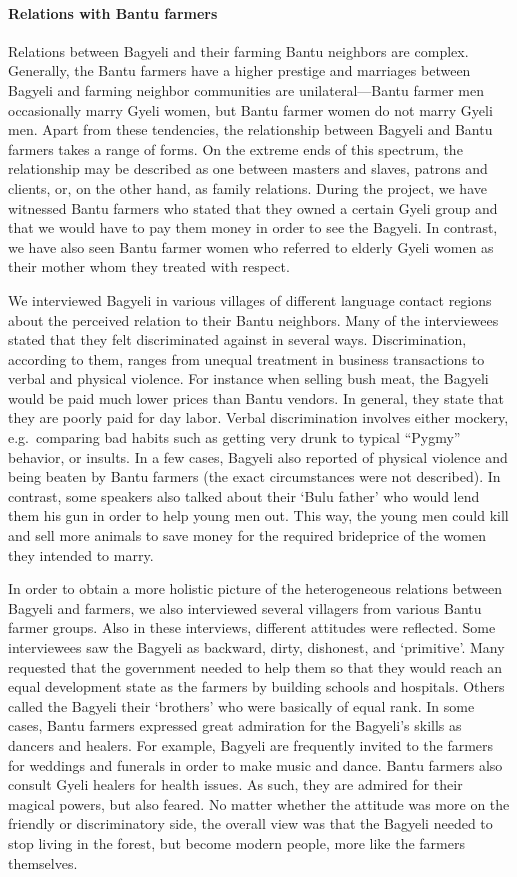 \paragraph{Relations with Bantu farmers}
Relations between Bagyeli and their farming Bantu neighbors are complex. Generally, the Bantu farmers have a higher prestige and marriages between Bagyeli and farming neighbor communities are unilateral---Bantu farmer men occasionally marry Gyeli women, but Bantu farmer women do not marry Gyeli men. Apart from these tendencies, the relationship between Bagyeli and Bantu farmers takes a range of forms. On the extreme ends of this spectrum, the relationship may be described as one between masters and slaves, patrons and clients, or, on the other hand, as family relations. During the project, we have witnessed Bantu farmers who stated that they owned a certain Gyeli group and that we would have to pay them money in order to see the Bagyeli. In contrast, we have also seen Bantu farmer women who referred to elderly Gyeli women as their mother whom they treated with respect.

We interviewed Bagyeli in various villages of different language contact regions about the perceived relation to their Bantu neighbors. Many of the interviewees stated that they felt discriminated against in several ways. Discrimination, according to them, ranges from unequal treatment in business transactions to verbal and physical violence. For instance when selling bush meat, the Bagyeli would be paid much lower prices than Bantu vendors. In general, they state that they are poorly paid for day labor. Verbal discrimination involves either mockery, e.g.\ comparing bad habits such as getting very drunk to typical ``Pygmy'' behavior, or insults. In a few cases, Bagyeli also reported of physical violence and being beaten by Bantu farmers (the exact circumstances were not described). In contrast, some speakers also talked about their `Bulu father' who would lend them his gun in order to help young men out. This way, the young men could kill and sell more animals to save money for the required brideprice of the women they intended to marry.

In order to obtain a more holistic picture of the heterogeneous relations between Bagyeli and farmers, we also interviewed several villagers from various Bantu farmer groups. Also in these interviews, different attitudes were reflected. Some interviewees saw the Bagyeli as backward, dirty, dishonest, and `primitive'. Many requested that the government needed to help them so that they would reach an equal development state as the farmers by building schools and hospitals. Others called the Bagyeli their `brothers' who were basically of equal rank. In some cases, Bantu farmers expressed great admiration for the Bagyeli's skills as dancers and healers. For example, Bagyeli are frequently invited to the farmers for weddings and funerals in order to make music and dance. Bantu farmers also consult Gyeli healers for health issues. As such, they are admired for their magical powers, but also feared.
No matter whether the attitude was more on the friendly or discriminatory side, the overall view was that the Bagyeli needed to stop living in the forest, but become modern people, more like the farmers themselves. 

